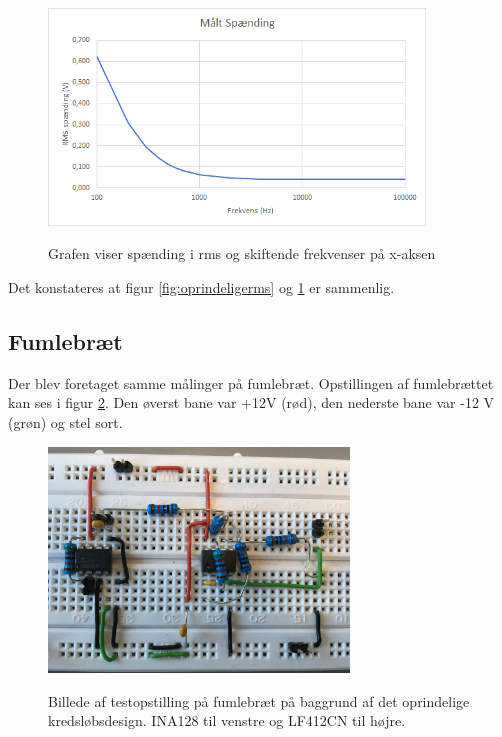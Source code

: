 \begin{figure}[H]
\centering
{\includegraphics[width=10cm]
{Figure/testopstilling1multisimVRMSgraf}}
\caption{Grafen viser spænding i rms og skiftende frekvenser på x-aksen} 
\label{fig:testopstilling1multisimVRMSgraf}
\end{figure}


Det konstateres at figur \ref{fig:oprindeligerms} og  \ref{fig:testopstilling1multisimVRMSgraf} er sammenlig.   



\pagebreak


\subsection{Fumlebræt}

Der blev foretaget samme målinger på fumlebræt. Opstillingen af fumlebrættet kan ses i figur \ref{fig:oprindeligekredslob2}. Den øverst bane var +12V (rød), den nederste bane var -12 V (grøn) og stel sort.  


\begin{figure}[H]
\centering
{\includegraphics[width=8cm]
{Figure/oprindeligekredslob2}}
\caption{Billede af testopstilling på fumlebræt på baggrund af det oprindelige kredsløbsdesign. INA128 til venstre og LF412CN til højre.}
\label{fig:oprindeligekredslob2}
\end{figure}


